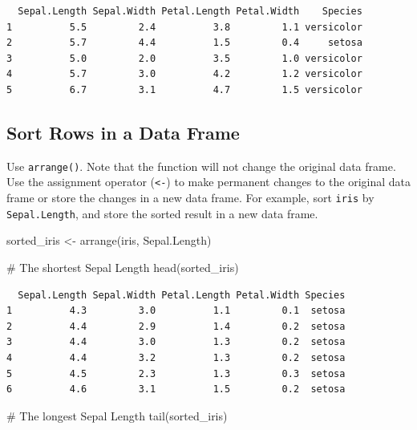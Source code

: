 \documentclass[
  letterpaper,
  DIV=11,
  numbers=noendperiod]{scrreprt}
\newenvironment{Shaded}{\begin{snugshade}}{\end{snugshade}}
\newcommand{\CommentTok}[1]{\textcolor[rgb]{0.37,0.37,0.37}{#1}}
\newcommand{\FunctionTok}[1]{\textcolor[rgb]{0.28,0.35,0.67}{#1}}
\newcommand{\NormalTok}[1]{\textcolor[rgb]{0.00,0.23,0.31}{#1}}
\newcommand{\OtherTok}[1]{\textcolor[rgb]{0.00,0.23,0.31}{#1}}
\begin{document}
\begin{verbatim}
  Sepal.Length Sepal.Width Petal.Length Petal.Width    Species
1          5.5         2.4          3.8         1.1 versicolor
2          5.7         4.4          1.5         0.4     setosa
3          5.0         2.0          3.5         1.0 versicolor
4          5.7         3.0          4.2         1.2 versicolor
5          6.7         3.1          4.7         1.5 versicolor
\end{verbatim}

\subsection{Sort Rows in a Data
Frame}\label{sort-rows-in-a-data-frame-1}

Use \texttt{arrange()}. Note that the function will not change the
original data frame. Use the assignment operator (\texttt{\textless{}-})
to make permanent changes to the original data frame or store the
changes in a new data frame. For example, sort \texttt{iris} by
\texttt{Sepal.Length}, and store the sorted result in a new data frame.

\begin{Shaded}
\begin{Highlighting}[]
\NormalTok{sorted\_iris }\OtherTok{\textless{}{-}} \FunctionTok{arrange}\NormalTok{(iris, Sepal.Length)}

\CommentTok{\# The shortest Sepal Length}
\FunctionTok{head}\NormalTok{(sorted\_iris)}
\end{Highlighting}
\end{Shaded}

\begin{verbatim}
  Sepal.Length Sepal.Width Petal.Length Petal.Width Species
1          4.3         3.0          1.1         0.1  setosa
2          4.4         2.9          1.4         0.2  setosa
3          4.4         3.0          1.3         0.2  setosa
4          4.4         3.2          1.3         0.2  setosa
5          4.5         2.3          1.3         0.3  setosa
6          4.6         3.1          1.5         0.2  setosa
\end{verbatim}

\begin{Shaded}
\begin{Highlighting}[]
\CommentTok{\# The longest Sepal Length}
\FunctionTok{tail}\NormalTok{(sorted\_iris)}
\end{Highlighting}
\end{Shaded}
\end{document}
